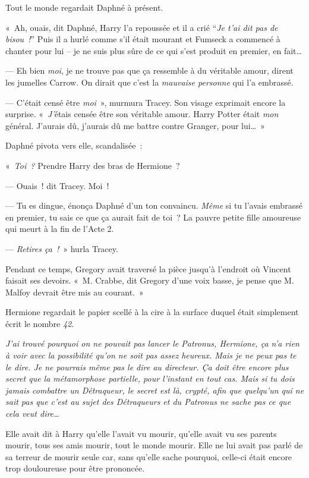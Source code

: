 Tout le monde regardait Daphné à présent.

«~Ah, ouais, dit Daphné, Harry l'a repoussée et il a crié “\emph{Je t'ai dit pas de bisou~!}” Puis il a hurlé comme s'il était mourant et Fumseck a commencé à chanter pour lui -- je ne suis plus sûre de ce qui s'est produit en premier, en fait…

--- Eh bien \emph{moi}, je ne trouve pas que ça ressemble à du véritable amour, dirent les jumelles Carrow. On dirait que c'est la \emph{mauvaise personne} qui l'a embrassé.

--- C'était censé être \emph{moi}~», murmura Tracey. Son visage exprimait encore la surprise. «~\emph{J'}étais censée être son véritable amour. Harry Potter était \emph{mon} général. J'aurais dû, j'aurais dû me battre contre Granger, pour lui…~»

Daphné pivota vers elle, scandalisée~:

«~\emph{Toi~?} Prendre Harry des bras de Hermione~?

--- Ouais~! dit Tracey. Moi~!

--- Tu es dingue, énonça Daphné d'un ton convaincu. \emph{Même} si tu l'avais embrassé en premier, tu sais ce que ça aurait fait de toi~? La pauvre petite fille amoureuse qui meurt à la fin de l'Acte 2.

--- \emph{Retires ça~!}~» hurla Tracey.

Pendant ce temps, Gregory avait traversé la pièce jusqu'à l'endroit où Vincent faisait ses devoirs. «~M. Crabbe, dit Gregory d'une voix basse, je pense que M. Malfoy devrait être mis au courant.~»


Hermione regardait le papier scellé à la cire à la surface duquel était simplement écrit le nombre \emph{42}.

\emph{J'ai trouvé pourquoi on ne pouvait pas lancer le Patronus, Hermione, ça n'a rien à voir avec la possibilité qu'on ne soit pas assez heureux. Mais je ne peux pas te le dire. Je ne pourrais même pas le dire au directeur. Ça doit être encore plus secret que la métamorphose partielle, pour l'instant en tout cas. Mais si tu dois jamais combattre un Détraqueur, le secret est là, crypté, afin que quelqu'un qui ne sait pas que c'est au sujet des Détraqueurs et du Patronus ne sache pas ce que cela veut dire…}

Elle avait dit à Harry qu'elle l'avait vu mourir, qu'elle avait vu ses parents mourir, tous ses amis mourir, tout le monde mourir. Elle ne lui avait pas parlé de sa terreur de mourir seule car, sans qu'elle sache pourquoi, celle-ci était encore trop douloureuse pour être prononcée.

